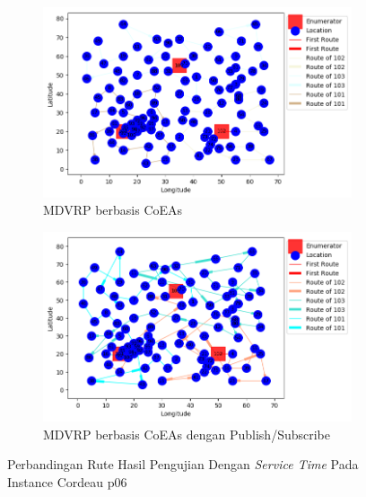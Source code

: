 \begin{figure}[H]
	\centering
	\begin{subfigure}[t]{\textwidth}
		\centering
		\includegraphics[width=\textwidth]{Resources/Images/cordeau_p06_tw/cordeau_p06_tw_coes}
		\caption{MDVRP berbasis CoEAs}
		\label{fig:cordeau_p06_tw_coes}
	\end{subfigure}
	\begin{subfigure}[t]{\textwidth}
		\centering
		\includegraphics[width=\textwidth]{Resources/Images/cordeau_p06_tw/cordeau_p06_tw_pubsub_coes}
		\caption{MDVRP berbasis CoEAs dengan Publish/Subscribe}
		\label{fig:cordeau_p06_tw_pubsub_coes}
	\end{subfigure}
	\caption{Perbandingan Rute Hasil Pengujian Dengan \textit{Service Time} Pada Instance Cordeau p06}
	\label{fig:cordeau_p06_tw}
\end{figure}


